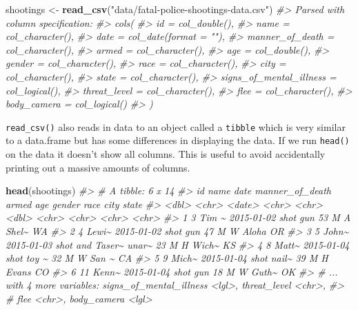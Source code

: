 \documentclass[
  12pt,
]{book}
\newenvironment{Shaded}{\begin{snugshade}}{\end{snugshade}}
\newcommand{\CommentTok}[1]{\textcolor[rgb]{0.37,0.37,0.37}{\textit{#1}}}
\newcommand{\KeywordTok}[1]{\textcolor[rgb]{0.27,0.27,0.27}{\textbf{#1}}}
\newcommand{\NormalTok}[1]{#1}
\newcommand{\StringTok}[1]{\textcolor[rgb]{0.5,0.5,0.5}{#1}}
\begin{document}
\begin{Shaded}
\begin{Highlighting}[]
\NormalTok{shootings <{-}}\StringTok{ }\KeywordTok{read\_csv}\NormalTok{(}\StringTok{"data/fatal{-}police{-}shootings{-}data.csv"}\NormalTok{)}
\CommentTok{\#> Parsed with column specification:}
\CommentTok{\#> cols(}
\CommentTok{\#>   id = col\_double(),}
\CommentTok{\#>   name = col\_character(),}
\CommentTok{\#>   date = col\_date(format = ""),}
\CommentTok{\#>   manner\_of\_death = col\_character(),}
\CommentTok{\#>   armed = col\_character(),}
\CommentTok{\#>   age = col\_double(),}
\CommentTok{\#>   gender = col\_character(),}
\CommentTok{\#>   race = col\_character(),}
\CommentTok{\#>   city = col\_character(),}
\CommentTok{\#>   state = col\_character(),}
\CommentTok{\#>   signs\_of\_mental\_illness = col\_logical(),}
\CommentTok{\#>   threat\_level = col\_character(),}
\CommentTok{\#>   flee = col\_character(),}
\CommentTok{\#>   body\_camera = col\_logical()}
\CommentTok{\#> )}
\end{Highlighting}
\end{Shaded}

\texttt{read\_csv()} also reads in data to an object called a \texttt{tibble} which is very similar to a data.frame but has some differences in displaying the data. If we run \texttt{head()} on the data it doesn't show all columns. This is useful to avoid accidentally printing out a massive amounts of columns.

\begin{Shaded}
\begin{Highlighting}[]
\KeywordTok{head}\NormalTok{(shootings)}
\CommentTok{\#> \# A tibble: 6 x 14}
\CommentTok{\#>      id name  date       manner\_of\_death armed   age gender race  city  state}
\CommentTok{\#>   <dbl> <chr> <date>     <chr>           <chr> <dbl> <chr>  <chr> <chr> <chr>}
\CommentTok{\#> 1     3 Tim \textasciitilde{} 2015{-}01{-}02 shot            gun      53 M      A     Shel\textasciitilde{} WA   }
\CommentTok{\#> 2     4 Lewi\textasciitilde{} 2015{-}01{-}02 shot            gun      47 M      W     Aloha OR   }
\CommentTok{\#> 3     5 John\textasciitilde{} 2015{-}01{-}03 shot and Taser\textasciitilde{} unar\textasciitilde{}    23 M      H     Wich\textasciitilde{} KS   }
\CommentTok{\#> 4     8 Matt\textasciitilde{} 2015{-}01{-}04 shot            toy \textasciitilde{}    32 M      W     San \textasciitilde{} CA   }
\CommentTok{\#> 5     9 Mich\textasciitilde{} 2015{-}01{-}04 shot            nail\textasciitilde{}    39 M      H     Evans CO   }
\CommentTok{\#> 6    11 Kenn\textasciitilde{} 2015{-}01{-}04 shot            gun      18 M      W     Guth\textasciitilde{} OK   }
\CommentTok{\#> \# ... with 4 more variables: signs\_of\_mental\_illness <lgl>, threat\_level <chr>,}
\CommentTok{\#> \#   flee <chr>, body\_camera <lgl>}
\end{Highlighting}
\end{Shaded}
\end{document}
